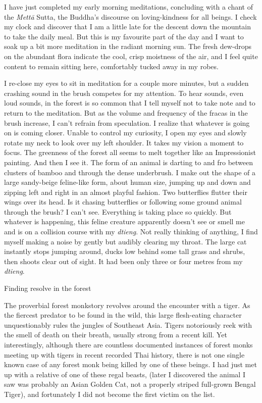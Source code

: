 I have just completed my early morning meditations, concluding with a
chant of the \emph{Mettā} Sutta, the Buddha's discourse on
loving-kindness for all beings. I check my clock and discover that I am
a little late for the descent down the mountain to take the daily meal.
But this is my favourite part of the day and I want to soak up a bit
more meditation in the radiant morning sun. The fresh dew-drops on the
abundant flora indicate the cool, crisp moistness of the air, and I feel
quite content to remain sitting here, comfortably tucked away in my
robes.

I re-close my eyes to sit in meditation for a couple more minutes, but a
sudden crashing sound in the brush competes for my attention. To hear
sounds, even loud sounds, in the forest is so common that I tell myself
not to take note and to return to the meditation. But as the volume and
frequency of the fracas in the brush increase, I can't refrain from
speculation. I realize that whatever is going on is coming closer.
Unable to control my curiosity, I open my eyes and slowly rotate my neck
to look over my left shoulder. It takes my vision a moment to focus. The
greenness of the forest all seems to melt together like an Impressionist
painting. And then I see it. The form of an animal is darting to and fro
between clusters of bamboo and through the dense underbrush. I make out
the shape of a large sandy-beige feline-like form, about human size,
jumping up and down and zipping left and right in an almost playful
fashion. Two butterflies flutter their wings over its head. Is it
chasing butterflies or following some ground animal through the brush? I
can't see. Everything is taking place so quickly. But whatever is
happening, this feline creature apparently doesn't see or smell me and
is on a collision course with my \emph{dtieng}. Not really thinking of
anything, I find myself making a noise by gently but audibly clearing my
throat. The large cat instantly stops jumping around, ducks low behind
some tall grass and shrubs, then shoots clear out of sight. It had been
only three or four metres from my \emph{dtieng}.

Finding resolve in the forest

The proverbial forest monkstory revolves around the encounter with a
tiger. As the fiercest predator to be found in the wild, this large
flesh-eating character unquestionably rules the jungles of Southeast
Asia. Tigers notoriously reek with the smell of death on their breath,
usually strong from a recent kill. Yet interestingly, although there are
countless documented instances of forest monks meeting up with tigers in
recent recorded Thai history, there is not one single known case of any
forest monk being killed by one of these beings. I had just met up with
a relative of one of these regal beasts, (later I discovered the animal
I saw was probably an Asian Golden Cat, not a properly striped
full-grown Bengal Tiger), and fortunately I did not become the first
victim on the list.

